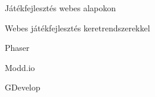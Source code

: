 \begin{MyChapter}{Játékfejlesztés webes alapokon}
\begin{MySection}{Webes játékfejlesztés keretrendszerekkel}
		\begin{MySubSection}{Phaser}
		\end{MySubSection}
		
		\begin{MySubSection}{Modd.io}
		\end{MySubSection}
		
		\begin{MySubSection}{GDevelop}
		\end{MySubSection}
		
	\end{MySection}
	
\end{MyChapter}